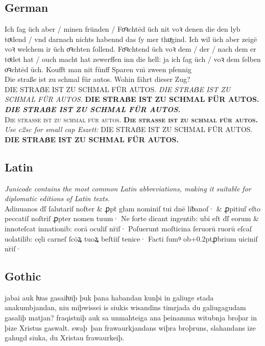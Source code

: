 \documentclass[12pt,a4paper,openany]{book}
\newcommand{\saltb}[1]{{\addfontfeatures{Alternate=1}{#1}}}
\begin{document}
\subsection*{German}

Ich ſag üch aber / minen fründen / Foͤꝛchtēd üch nit voꝛ denen die den
lyb toͤdend / vnd darnach nichts habennd das ſy mer thuͤgind. Ich wil
üch aber zeigē voꝛ welchem ir üch \saltb{f}oͤꝛchten ſollend. Foͤꝛchtend üch voꝛ
dem / der / nach dem er toͤdet hat / ouch macht hat zewerffen inn die
hell: ja ich ſag üch / voꝛ dem ſelben \saltb{f}oͤꝛchtēd üch. Koufft man nit
fünff Sparen vm̄ zween pfennig\\[1ex]
{\Large Die straße ist zu schmal für autos. Wohin fährt dieser Zug?}\\
DIE STRAẞE IST ZU SCHMAL FÜR AUTOS.
{\itshape DIE STRAẞE IST ZU SCHMAL FÜR AUTOS.}
{\bfseries DIE STRAẞE IST ZU SCHMAL FÜR AUTOS.}
{\itshape\bfseries DIE STRAẞE IST ZU SCHMAL FÜR AUTOS.}\\[1ex]
{\scshape Die straße ist zu schmal für autos.
\bfseries Die straße ist zu schmal für autos.}
{\itshape Use c2sc for small cap Eszett:}
{DIE STRAẞE IST ZU SCHMAL FÜR AUTOS.
\bfseries DIE STRAẞE IST ZU SCHMAL FÜR AUTOS.}



\subsection*{Latin}

{\small\itshape Junicode contains the most common Latin abbreviations,
  making it suitable for diplomatic editions of Latin texts.}\\[1ex]
{Adiuuanos dſ̄ ſalutariſ noſter \&
 ꝓpt̄ głam nominiſ tui dnē liƀanoſ· \& ꝓpitiuſ eſto peccatiſ noſtriſ
 ꝓpter nomen tuum· Ne forte dicant ingentib: ubi eſt dſ̄ eorum \&
  innoteſcat innationib: corā oculiſ nr̄iſ· Poſuerunt moſticina
  ſeruorū ruorū eſcaſ uolatilib: cęli carneſ ſcōꝝ tuoꝝ beſtiiſ tenice·
  Facti ſumꝰ ob\kern+0.2ptꝓbrium uiciniſ nr̄iſ·}

\subsection*{Gothic}

jabai auk ƕas gasaiƕiþ þuk þana habandan kunþi in galiuge stada
anakumbjandan, niu miþwissei is siukis wis\-an\-dins timrjada du
galiugagudam gasaliþ matjan?  fraqistniþ auk sa unmahteiga ana
þeinamma witubnja broþar in þize Xristus gaswalt.  swaþ~þan
frawaurkjandans wiþra broþruns, slahandans ize gahugd siuka, du
Xristau fra\-waur\-keiþ.\\
\end{document}
